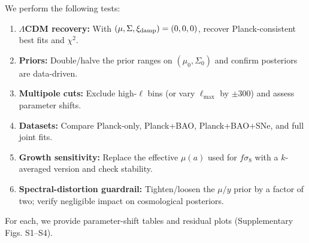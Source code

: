 \label{sec:robust}

We perform the following tests:
\begin{enumerate}
  \item \textbf{$\Lambda$CDM recovery:} With $(\mu,\Sigma,\xi_{\rm damp})=(0,0,0)$, recover Planck-consistent best fits and $\chi^2$.
  \item \textbf{Priors:} Double/halve the prior ranges on $(\mu_0,\Sigma_0)$ and confirm posteriors are data-driven.
  \item \textbf{Multipole cuts:} Exclude high-$\ell$ bins (or vary $\ell_{\max}$ by $\pm 300$) and assess parameter shifts.
  \item \textbf{Datasets:} Compare Planck-only, Planck+BAO, Planck+BAO+SNe, and full joint fits.
  \item \textbf{Growth sensitivity:} Replace the effective $\mu(a)$ used for $f\sigma_8$ with a $k$-averaged version and check stability.
  \item \textbf{Spectral-distortion guardrail:} Tighten/loosen the $\mu/y$ prior by a factor of two; verify negligible impact on cosmological posteriors.
\end{enumerate}
For each, we provide parameter-shift tables and residual plots (Supplementary Figs. S1--S4).

